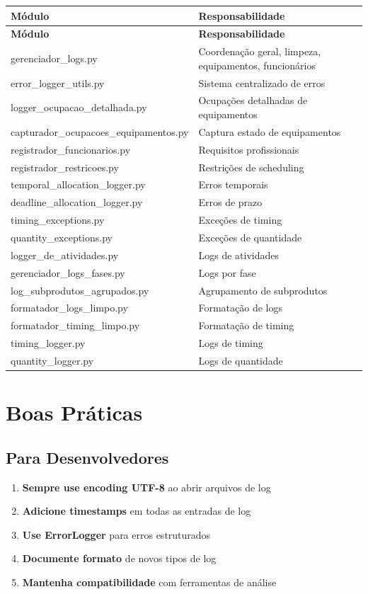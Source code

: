 \documentclass[11pt,a4paper]{article}
\begin{document}
\begin{longtable}{lp{8cm}}
\textbf{Módulo} & \textbf{Responsabilidade} \\
\hline
\endfirsthead
\textbf{Módulo} & \textbf{Responsabilidade} \\
\hline
\endhead

gerenciador\_logs.py & Coordenação geral, limpeza, equipamentos, funcionários \\
error\_logger\_utils.py & Sistema centralizado de erros \\
logger\_ocupacao\_detalhada.py & Ocupações detalhadas de equipamentos \\
capturador\_ocupacoes\_equipamentos.py & Captura estado de equipamentos \\
registrador\_funcionarios.py & Requisitos profissionais \\
registrador\_restricoes.py & Restrições de scheduling \\
temporal\_allocation\_logger.py & Erros temporais \\
deadline\_allocation\_logger.py & Erros de prazo \\
timing\_exceptions.py & Exceções de timing \\
quantity\_exceptions.py & Exceções de quantidade \\
logger\_de\_atividades.py & Logs de atividades \\
gerenciador\_logs\_fases.py & Logs por fase \\
log\_subprodutos\_agrupados.py & Agrupamento de subprodutos \\
formatador\_logs\_limpo.py & Formatação de logs \\
formatador\_timing\_limpo.py & Formatação de timing \\
timing\_logger.py & Logs de timing \\
quantity\_logger.py & Logs de quantidade \\
\hline
\end{longtable}

\newpage

\section{Boas Práticas}

\subsection{Para Desenvolvedores}

\begin{enumerate}
    \item \textbf{Sempre use encoding UTF-8} ao abrir arquivos de log
    \item \textbf{Adicione timestamps} em todas as entradas de log
    \item \textbf{Use ErrorLogger} para erros estruturados
    \item \textbf{Documente formato} de novos tipos de log
    \item \textbf{Mantenha compatibilidade} com ferramentas de análise
\end{enumerate}
\end{document}
